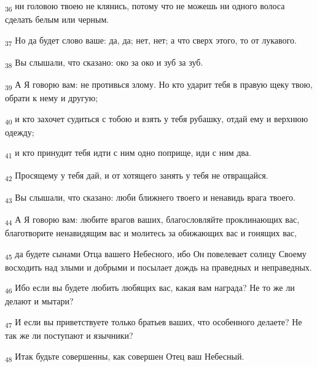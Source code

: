 \begin{tcolorbox}
\textsubscript{36} ни головою твоею не клянись, потому что не можешь ни одного волоса сделать белым или черным.
\end{tcolorbox}
\begin{tcolorbox}
\textsubscript{37} Но да будет слово ваше: да, да; нет, нет; а что сверх этого, то от лукавого.
\end{tcolorbox}
\begin{tcolorbox}
\textsubscript{38} Вы слышали, что сказано: око за око и зуб за зуб.
\end{tcolorbox}
\begin{tcolorbox}
\textsubscript{39} А Я говорю вам: не противься злому. Но кто ударит тебя в правую щеку твою, обрати к нему и другую;
\end{tcolorbox}
\begin{tcolorbox}
\textsubscript{40} и кто захочет судиться с тобою и взять у тебя рубашку, отдай ему и верхнюю одежду;
\end{tcolorbox}
\begin{tcolorbox}
\textsubscript{41} и кто принудит тебя идти с ним одно поприще, иди с ним два.
\end{tcolorbox}
\begin{tcolorbox}
\textsubscript{42} Просящему у тебя дай, и от хотящего занять у тебя не отвращайся.
\end{tcolorbox}
\begin{tcolorbox}
\textsubscript{43} Вы слышали, что сказано: люби ближнего твоего и ненавидь врага твоего.
\end{tcolorbox}
\begin{tcolorbox}
\textsubscript{44} А Я говорю вам: любите врагов ваших, благословляйте проклинающих вас, благотворите ненавидящим вас и молитесь за обижающих вас и гонящих вас,
\end{tcolorbox}
\begin{tcolorbox}
\textsubscript{45} да будете сынами Отца вашего Небесного, ибо Он повелевает солнцу Своему восходить над злыми и добрыми и посылает дождь на праведных и неправедных.
\end{tcolorbox}
\begin{tcolorbox}
\textsubscript{46} Ибо если вы будете любить любящих вас, какая вам награда? Не то же ли делают и мытари?
\end{tcolorbox}
\begin{tcolorbox}
\textsubscript{47} И если вы приветствуете только братьев ваших, что особенного делаете? Не так же ли поступают и язычники?
\end{tcolorbox}
\begin{tcolorbox}
\textsubscript{48} Итак будьте совершенны, как совершен Отец ваш Небесный.
\end{tcolorbox}
